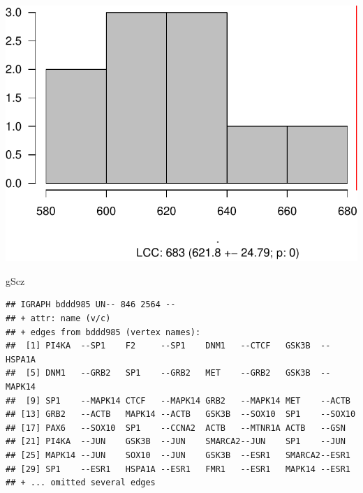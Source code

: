 \documentclass[
]{book}
\newenvironment{Shaded}{\begin{snugshade}}{\end{snugshade}}
\newcommand{\NormalTok}[1]{#1}
\begin{document}
\includegraphics{NetMed_files/figure-latex/unnamed-chunk-23-1.pdf}

\begin{Shaded}
\begin{Highlighting}[]
\NormalTok{gScz }
\end{Highlighting}
\end{Shaded}

\begin{verbatim}
## IGRAPH bddd985 UN-- 846 2564 -- 
## + attr: name (v/c)
## + edges from bddd985 (vertex names):
##  [1] PI4KA  --SP1    F2     --SP1    DNM1   --CTCF   GSK3B  --HSPA1A
##  [5] DNM1   --GRB2   SP1    --GRB2   MET    --GRB2   GSK3B  --MAPK14
##  [9] SP1    --MAPK14 CTCF   --MAPK14 GRB2   --MAPK14 MET    --ACTB  
## [13] GRB2   --ACTB   MAPK14 --ACTB   GSK3B  --SOX10  SP1    --SOX10 
## [17] PAX6   --SOX10  SP1    --CCNA2  ACTB   --MTNR1A ACTB   --GSN   
## [21] PI4KA  --JUN    GSK3B  --JUN    SMARCA2--JUN    SP1    --JUN   
## [25] MAPK14 --JUN    SOX10  --JUN    GSK3B  --ESR1   SMARCA2--ESR1  
## [29] SP1    --ESR1   HSPA1A --ESR1   FMR1   --ESR1   MAPK14 --ESR1  
## + ... omitted several edges
\end{verbatim}
\end{document}
